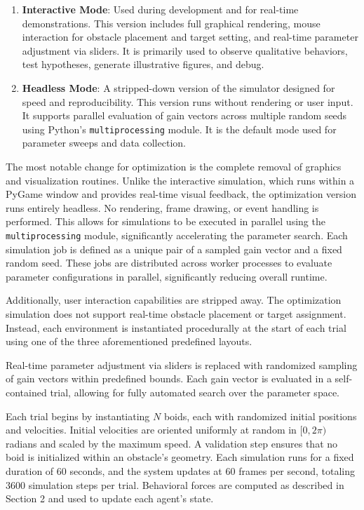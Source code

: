 \documentclass[12pt]{article}
\begin{document}
\begin{enumerate}[nosep]
    \item \textbf{Interactive Mode}: Used during development and for real-time demonstrations. This version includes full graphical rendering, mouse interaction for obstacle placement and target setting, and real-time parameter adjustment via sliders. It is primarily used to observe qualitative behaviors, test hypotheses, generate illustrative figures, and debug.
    \item \textbf{Headless Mode}: A stripped-down version of the simulator designed for speed and reproducibility. This version runs without rendering or user input. It supports parallel evaluation of gain vectors across multiple random seeds using Python's \texttt{multiprocessing} module. It is the default mode used for parameter sweeps and data collection.
\end{enumerate}

The most notable change for optimization is the complete removal of graphics and visualization routines. Unlike the interactive simulation, which runs within a PyGame window and provides real-time visual feedback, the optimization version runs entirely headless. No rendering, frame drawing, or event handling is performed. This allows for simulations to be executed in parallel using the \texttt{multiprocessing} module, significantly accelerating the parameter search. Each simulation job is defined as a unique pair of a sampled gain vector and a fixed random seed. These jobs are distributed across worker processes to evaluate parameter configurations in parallel, significantly reducing overall runtime.

Additionally, user interaction capabilities are stripped away. The optimization simulation does not support real-time obstacle placement or target assignment. Instead, each environment is instantiated procedurally at the start of each trial using one of the three aforementioned predefined layouts.

Real-time parameter adjustment via sliders is replaced with randomized sampling of gain vectors within predefined bounds. Each gain vector is evaluated in a self-contained trial, allowing for fully automated search over the parameter space.

Each trial begins by instantiating \(N\) boids, each with randomized initial positions and velocities. Initial velocities are oriented uniformly at random in \([0, 2\pi)\) radians and scaled by the maximum speed. A validation step ensures that no boid is initialized within an obstacle's geometry. Each simulation runs for a fixed duration of 60 seconds, and the system updates at 60 frames per second, totaling 3600 simulation steps per trial. Behavioral forces are computed as described in Section 2 and used to update each agent’s state.
\end{document}
